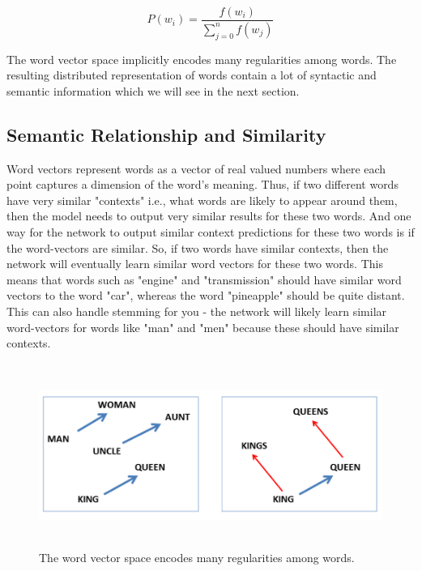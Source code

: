 \begin{equation}
P(w_{i}) = \frac{f(w_{i})}{\sum_{j=0}^{n}f(w_{j})}
\end{equation}

The word vector space implicitly encodes many regularities among words. The resulting distributed representation of words contain a lot of syntactic and semantic information which we will see in the next section.

\subsection{Semantic Relationship and Similarity}

Word vectors represent words as a vector of real valued numbers where each point captures a dimension of the word's meaning. Thus, if two different words have very similar "contexts" i.e., what words are likely to appear around them, then the model needs to output very similar results for these two words. And one way for the network to output similar context predictions for these two words is if the word-vectors are similar. So, if two words have similar contexts, then the network will eventually learn similar word vectors for these two words. This means that words such as "engine" and "transmission" should have similar word vectors to the word "car", whereas the word "pineapple" should be quite distant. This can also handle stemming for you - the network will likely learn similar word-vectors for words like "man" and "men" because these should have similar contexts.

\newpage

\begin{figure}[htbp]
\centering
\includegraphics[width=12cm, height=6cm]{images/wv-similarities.PNG}
\centering
\caption{The word vector space encodes many regularities among words.}
\label{fig:foo}
\end{figure}

